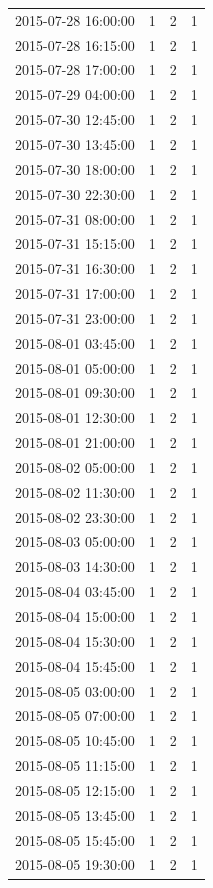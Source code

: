 \begin{tabular}{lrrr}
2015-07-28 16:00:00 & 1 & 2 & 1 \\
2015-07-28 16:15:00 & 1 & 2 & 1 \\
2015-07-28 17:00:00 & 1 & 2 & 1 \\
2015-07-29 04:00:00 & 1 & 2 & 1 \\
2015-07-30 12:45:00 & 1 & 2 & 1 \\
2015-07-30 13:45:00 & 1 & 2 & 1 \\
2015-07-30 18:00:00 & 1 & 2 & 1 \\
2015-07-30 22:30:00 & 1 & 2 & 1 \\
2015-07-31 08:00:00 & 1 & 2 & 1 \\
2015-07-31 15:15:00 & 1 & 2 & 1 \\
2015-07-31 16:30:00 & 1 & 2 & 1 \\
2015-07-31 17:00:00 & 1 & 2 & 1 \\
2015-07-31 23:00:00 & 1 & 2 & 1 \\
2015-08-01 03:45:00 & 1 & 2 & 1 \\
2015-08-01 05:00:00 & 1 & 2 & 1 \\
2015-08-01 09:30:00 & 1 & 2 & 1 \\
2015-08-01 12:30:00 & 1 & 2 & 1 \\
2015-08-01 21:00:00 & 1 & 2 & 1 \\
2015-08-02 05:00:00 & 1 & 2 & 1 \\
2015-08-02 11:30:00 & 1 & 2 & 1 \\
2015-08-02 23:30:00 & 1 & 2 & 1 \\
2015-08-03 05:00:00 & 1 & 2 & 1 \\
2015-08-03 14:30:00 & 1 & 2 & 1 \\
2015-08-04 03:45:00 & 1 & 2 & 1 \\
2015-08-04 15:00:00 & 1 & 2 & 1 \\
2015-08-04 15:30:00 & 1 & 2 & 1 \\
2015-08-04 15:45:00 & 1 & 2 & 1 \\
2015-08-05 03:00:00 & 1 & 2 & 1 \\
2015-08-05 07:00:00 & 1 & 2 & 1 \\
2015-08-05 10:45:00 & 1 & 2 & 1 \\
2015-08-05 11:15:00 & 1 & 2 & 1 \\
2015-08-05 12:15:00 & 1 & 2 & 1 \\
2015-08-05 13:45:00 & 1 & 2 & 1 \\
2015-08-05 15:45:00 & 1 & 2 & 1 \\
2015-08-05 19:30:00 & 1 & 2 & 1 \\

\end{tabular}
